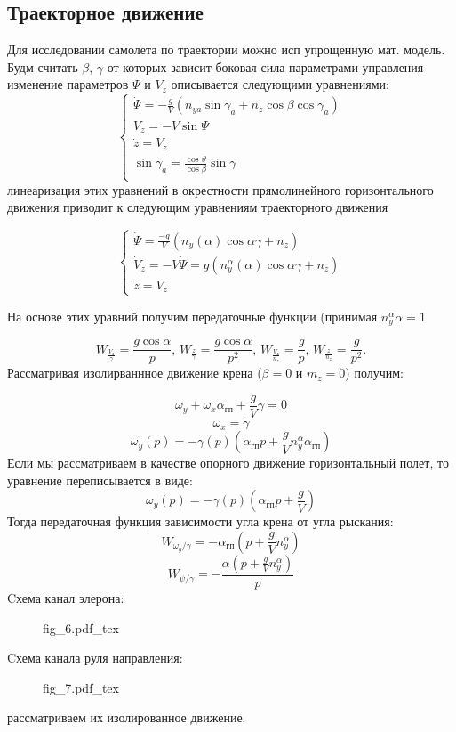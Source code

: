 \documentclass{article}
\begin{document}
\subsection{Траекторное движение}
Для исследовании самолета по траектории можно исп упрощенную мат. модель. Будм считать $\beta$, $\gamma$ от которых зависит боковая сила параметрами управления изменение параметров $\Psi$ и $V_z$ описывается следующими уравнениями:
\begin{equation}
	\begin{cases}
		\dot{\Psi} = -\frac{g}{V}(n_{ya} \sin{\gamma_a} + n_z \cos{\beta} \cos{\gamma_a}) \\
		V_z = -V\sin{\Psi}                                                                \\
		\dot{z} = V_z                                                                     \\
		
		\sin{\gamma_a} = \frac{\cos{\vartheta}}{\cos{\beta}} \sin{\gamma}                 \\
	\end{cases}
\end{equation}
линеаризация этих уравнений в окрестности прямолинейного горизонтального движения приводит к следующим уравнениям траекторного движения

\begin{equation}
	\begin{cases}
		\dot{\Psi} = \frac{-g}{V}(n_y(\alpha)\cos{\alpha}\gamma + n_z)               \\
		\dot{V}_z = -V \dot{\Psi} = g(n_y^{\alpha}(\alpha) \cos{\alpha\gamma} + n_z) \\
		\dot{z} = V_z
	\end{cases}
\end{equation}

На основе этих уравний получим передаточные функции (принимая $n_y^{\alpha} \alpha =1 $

\[
	W_{\frac{V_z}{\gamma}} = \frac{g\cos{\alpha}}{p}, \, W_{\frac{z}{\gamma}} = \frac{g\cos{\alpha}}{p^2}, \, W_{\frac{V_z}{n_z}}= \frac{g}{p}, \, W_{\frac{z}{n_z}} = \frac{g}{p^2}.
\]
Рассматривая изолирваннное движение крена ($\beta = 0$ и $m_z = 0$) получим:

\[
    \omega_y + \omega_x \alpha_{\text{гп}} + \frac{g}{V}\gamma = 0
\]
\[
	\omega_x = \dot{\gamma}
\]
\[
	\omega_y(p) = -\gamma(p)(\alpha_\text{гп}p + \frac{g}{V}n_y^\alpha \alpha_\text{гп})
\]
Если мы рассматриваем в качестве опорного движение горизонтальный полет, то уравнение переписывается в виде:
\[
	\omega_y(p) = -\gamma(p)(\alpha_\text{гп}p + \frac{g}{V})
\]
Тогда передаточная функция зависимости угла крена от угла рыскания:
\[
	W_{\omega_y/\gamma} = -\alpha_\text{гп} (p+\frac{g}{V}n_y^\alpha)
\]
\[
	W_{\psi/\gamma} = -\frac{\alpha(p + \frac{g}{V} n_y^\alpha)} {p}
\]
Cхема канал элерона:
\begin{figure}[H]
	\centering
	{fig_6.pdf_tex}
\end{figure}
Cхема канала руля направления:
\begin{figure}[H]
	\centering
	{fig_7.pdf_tex}
\end{figure}
рассматриваем их изолированное движение.
\end{document}
